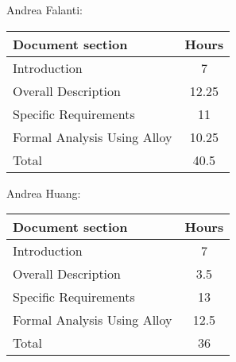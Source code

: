 Andrea Falanti:

\begin{tabular}{|l|c|}
    \hline
    Document section & Hours \\
    \hline
     Introduction & 7\\
     Overall Description & 12.25\\
     Specific Requirements & 11\\
     Formal Analysis Using Alloy & 10.25\\
     \hline
     Total & 40.5\\
     \hline
\end{tabular}
\vskip 0.3in

Andrea Huang:

\begin{tabular}{|l|c|}
    \hline
    Document section & Hours \\
    \hline
     Introduction &  7\\
     Overall Description & 3.5\\
     Specific Requirements & 13\\
     Formal Analysis Using Alloy & 12.5\\
     \hline
     Total & 36\\
     \hline
\end{tabular}